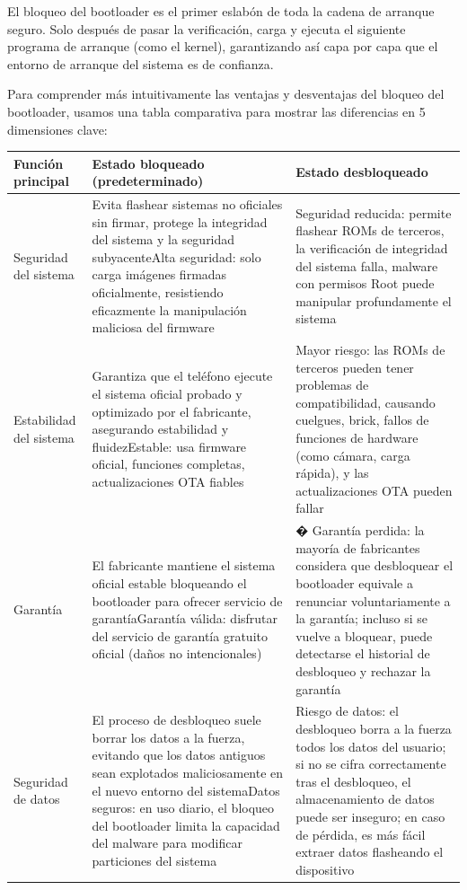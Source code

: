 
El bloqueo del bootloader es el primer eslabón de toda la cadena de arranque seguro. Solo después de pasar la verificación, carga y ejecuta el siguiente programa de arranque (como el kernel), garantizando así capa por capa que el entorno de arranque del sistema es de confianza.


Para comprender más intuitivamente las ventajas y desventajas del bloqueo del bootloader, usamos una tabla comparativa para mostrar las diferencias en 5 dimensiones clave:

\begin{center}
\begin{tabularx}{\linewidth}{|X|X|X|}
\hline
\textbf{Función principal} & \textbf{Estado bloqueado (predeterminado)} & \textbf{Estado desbloqueado} \tabularnewline
\hline
Seguridad del sistema & Evita flashear sistemas no oficiales sin firmar, protege la integridad del sistema y la seguridad subyacente\newline Alta seguridad: solo carga imágenes firmadas oficialmente, resistiendo eficazmente la manipulación maliciosa del firmware & Seguridad reducida: permite flashear ROMs de terceros, la verificación de integridad del sistema falla, malware con permisos Root puede manipular profundamente el sistema \tabularnewline
Estabilidad del sistema & Garantiza que el teléfono ejecute el sistema oficial probado y optimizado por el fabricante, asegurando estabilidad y fluidez\newline Estable: usa firmware oficial, funciones completas, actualizaciones OTA fiables & Mayor riesgo: las ROMs de terceros pueden tener problemas de compatibilidad, causando cuelgues, brick, fallos de funciones de hardware (como cámara, carga rápida), y las actualizaciones OTA pueden fallar \tabularnewline
Garantía & El fabricante mantiene el sistema oficial estable bloqueando el bootloader para ofrecer servicio de garantía\newline Garantía válida: disfrutar del servicio de garantía gratuito oficial (daños no intencionales) & � Garantía perdida: la mayoría de fabricantes considera que desbloquear el bootloader equivale a renunciar voluntariamente a la garantía; incluso si se vuelve a bloquear, puede detectarse el historial de desbloqueo y rechazar la garantía \tabularnewline
Seguridad de datos & El proceso de desbloqueo suele borrar los datos a la fuerza, evitando que los datos antiguos sean explotados maliciosamente en el nuevo entorno del sistema\newline Datos seguros: en uso diario, el bloqueo del bootloader limita la capacidad del malware para modificar particiones del sistema & Riesgo de datos: el desbloqueo borra a la fuerza todos los datos del usuario; si no se cifra correctamente tras el desbloqueo, el almacenamiento de datos puede ser inseguro; en caso de pérdida, es más fácil extraer datos flasheando el dispositivo \tabularnewline

\end{tabularx}
\end{center}
